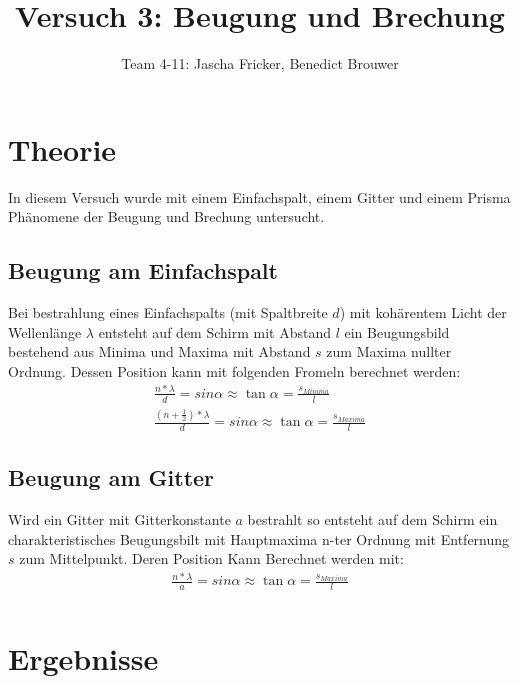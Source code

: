 \documentclass[11pt, a4paper]{article}
\title{Versuch 3: Beugung und Brechung}
\author{Team 4-11: Jascha Fricker, Benedict Brouwer}
\begin{document}
    \maketitle

    \tableofcontents

    \newpage

    \section{Theorie}
    \FloatBarrier
    In diesem Versuch wurde mit einem Einfachspalt, einem Gitter und einem Prisma Phänomene der Beugung und Brechung untersucht. 

    \subsection{Beugung am Einfachspalt}
    Bei bestrahlung eines Einfachspalts (mit Spaltbreite $d$) mit kohärentem Licht der Wellenlänge $\lambda$ entsteht auf dem Schirm mit Abstand $l$ ein Beugungsbild bestehend aus Minima und Maxima mit Abstand $s$ zum Maxima nullter Ordnung. Dessen Position kann mit folgenden Fromeln berechnet werden:
    \begin{align}
        \frac{n * \lambda}{d} = sin{\alpha} \approx \tan{\alpha} = \frac{s_{Minima}}{l} \label{eq:einfachspalt} \\
        \frac{(n + \frac{1}{2})* \lambda}{d} = sin{\alpha} \approx \tan{\alpha} = \frac{s_{Maxima}}{l} 
    \end{align}
    \subsection{Beugung am Gitter}
    Wird ein Gitter mit Gitterkonstante $a$ bestrahlt so entsteht auf dem Schirm ein charakteristisches Beugungsbilt mit Hauptmaxima n-ter Ordnung mit Entfernung $s$ zum Mittelpunkt. Deren Position Kann Berechnet werden mit:
    \begin{align}
        \frac{n * \lambda}{a} = sin{\alpha} \approx \tan{\alpha} = \frac{s_{Maxima}}{l} \label{eq:Gitter} \label{eq:Gitter}\\
        
    \end{align}
    \section{Ergebnisse}
\end{document}
